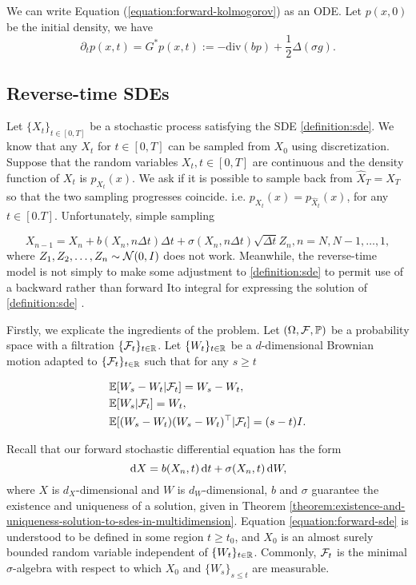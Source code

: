 \begin{remark}
  We can write Equation (\ref{equation:forward-kolmogorov}) as an ODE. Let $p(x,0)$ be the initial density, we have
  \begin{equation}
    \partial_t p(x,t) = G^*p(x,t) := -\mathrm{div} (bp) + \dfrac{1}{2}\Delta (\sigma g).
  \end{equation}
\end{remark}

\subsection{Reverse-time SDEs}
Let $\{X_t\}_{t\in[0,T]}$ be a stochastic process satisfying the SDE \ref{definition:sde}. We know that any $X_t$ for $t\in[0,T]$ can be sampled from $X_0$ using discretization. Suppose that the random variables $X_t, t\in[0,T]$ are continuous and the density function of $X_t$ is $p_{X_t}(x)$. We ask if it is possible to sample back from $\hat{X}_T = X_T$ so that the two sampling progresses coincide. i.e. $p_{X_t}(x) = p_{\hat{X}_t}(x)$, for any $t\in [0.T]$. Unfortunately, simple sampling

$$X_{n-1} = X_n + b(X_n, n\Delta t)\Delta t + \sigma(X_n, n\Delta t)\sqrt{\Delta t} Z_n, n = N, N-1, \ldots, 1,$$
where $Z_1,Z_2,\ldots, Z_n\sim\mathcal{N}(0,I)$ does not work. Meanwhile, the reverse-time model is not simply to make some adjustment to \ref{definition:sde} to permit use of a backward rather than forward Ito integral for expressing the solution of \ref{definition:sde} \cite{anderson1982reverse}.

Firstly, we explicate the ingredients of the problem. Let $(\Omega, \mathcal{F}, \mathbb{P})$ be a probability space with a filtration $\{\mathcal{F}_t\}_{t\in\mathbb{R}}$. Let $\{W_t\}_{t\in\mathbb{R}}$ be a $d$-dimensional Brownian motion adapted to $\{\mathcal{F}_t\}_{t\in\mathbb{R}}$ such that for any $s\ge t$

\begin{equation}
  \label{eqs:forward-sde-condition}
  \begin{aligned}
     & \mathbb{E}[W_s - W_t | \mathcal{F}_t] = W_s - W_t,                \\
     & \mathbb{E}[W_s | \mathcal{F}_t] = W_t,                            \\
     & \mathbb{E}[(W_s - W_t)(W_s - W_t)^\top | \mathcal{F}_t] = (s-t)I.
  \end{aligned}
\end{equation}

Recall that our forward stochastic differential equation has the form
\begin{equation}
  \label{equation:forward-sde}
  \,\mathrm{d} X=b(X_n,t)\,\mathrm{d} t+\sigma(X_n,t)\,\mathrm{d} W,
\end{equation}
where $X$ is $d_X$-dimensional and $W$ is $d_W$-dimensional, $b$ and $\sigma$ guarantee the existence and uniqueness of a solution, given in Theorem \ref{theorem:existence-and-uniqueness-solution-to-sdes-in-multidimension}. Equation \ref{equation:forward-sde} is understood to be defined in some region $t\ge t_0$, and $X_{0}$ is an almost surely bounded random variable independent of $\{W_t\}_{t\in\mathbb{R}}$. Commonly, $\mathcal{F}_t$ is the minimal $\sigma$-algebra with respect to which $X_{0}$ and $\{W_s\}_{s\le t}$ are measurable.

